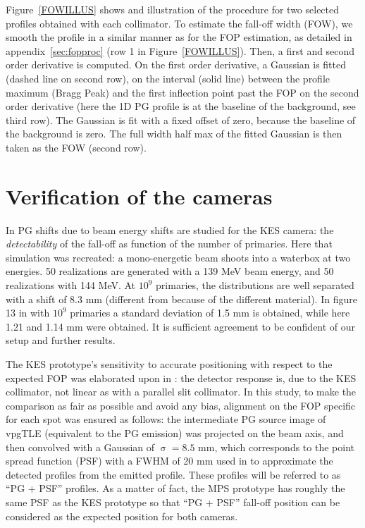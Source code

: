 \documentclass[a4paper,english,12pt]{article}
\newcommand{\qq}[1]{\enquote{#1}}
\begin{document}
Figure~\ref{FOWILLUS} shows and illustration of the procedure for two selected profiles obtained with each collimator. To estimate the fall-off width (FOW), we smooth the profile in a similar manner as for the FOP estimation, as detailed in appendix~\ref{sec:fopproc} (row 1 in Figure~\ref{FOWILLUS}). Then, a first and second order derivative is computed. On the first order derivative, a Gaussian is fitted (dashed line on second row), on the interval (solid line) between the profile maximum (Bragg Peak) and the first inflection point past the FOP on the second order derivative (here the 1D PG profile is at the baseline of the background, see third row). The Gaussian is fit with a fixed offset of zero, because the baseline of the background is zero. The full width half max of the fitted Gaussian is then taken as the FOW (second row).


\section{Verification of the cameras}

In \cite{Priegnitz2015} PG shifts due to beam energy shifts are studied for the KES camera: the \emph{detectability} of the fall-off as function of the number of primaries. Here that simulation was recreated: a mono-energetic beam shoots into a waterbox at two energies. 50 realizations are generated with a 139 MeV beam energy, and 50 realizations with 144 MeV. At $10^9$ primaries, the distributions are well separated with a shift of 8.3 mm (different from \cite{Priegnitz2015} because of the different material). In figure 13 in \cite{Perali2014} with $10^9$ primaries a standard deviation of 1.5 mm is obtained, while here 1.21 and 1.14 mm were obtained. It is sufficient agreement to be confident of our setup and further results.

The KES prototype's sensitivity to accurate positioning with respect to the expected FOP was elaborated upon in \citet[Section IV.A.3]{Sterpin2015}: the detector response is, due to the KES collimator, not linear as with a parallel slit collimator. In this study, to make the comparison as fair as possible and avoid any bias, alignment on the FOP specific for each spot was ensured as follows: the intermediate PG source image of vpgTLE (equivalent to the PG emission) was projected on the beam axis, and then convolved with a Gaussian of $\upsigma = 8.5$ mm, which corresponds to the point spread function (PSF) with a FWHM of 20 mm used in \cite{Priegnitz2015} to approximate the detected profiles from the emitted profile. These profiles will be referred to as \qq{PG + PSF} profiles. As a matter of fact, the MPS prototype has roughly the same PSF as the KES prototype so that \qq{PG + PSF} fall-off position can be considered as the expected position for both cameras.
\end{document}
